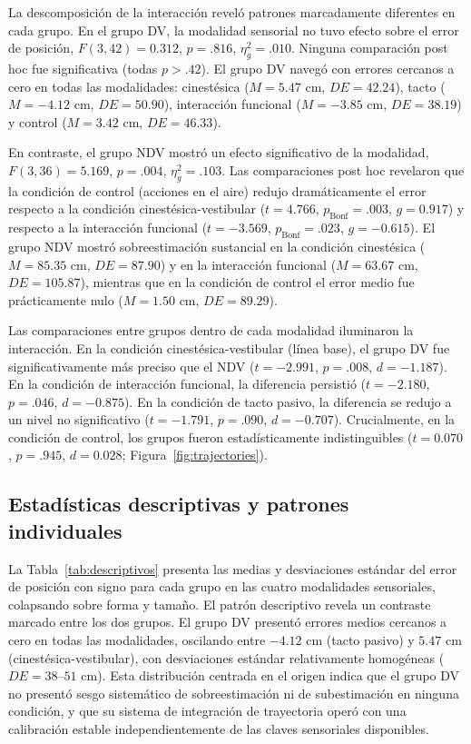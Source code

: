 \documentclass[12pt,letterpaper]{article}
\begin{document}
La descomposición de la interacción reveló patrones marcadamente diferentes en cada grupo. En el grupo DV, la modalidad sensorial no tuvo efecto sobre el error de posición, $F(3, 42) = 0.312$, $p = .816$, $\eta^2_g = .010$. Ninguna comparación post hoc fue significativa (todas $p > .42$). El grupo DV navegó con errores cercanos a cero en todas las modalidades: cinestésica ($M = 5.47$ cm, $DE = 42.24$), tacto ($M = -4.12$ cm, $DE = 50.90$), interacción funcional ($M = -3.85$ cm, $DE = 38.19$) y control ($M = 3.42$ cm, $DE = 46.33$).

En contraste, el grupo NDV mostró un efecto significativo de la modalidad, $F(3, 36) = 5.169$, $p = .004$, $\eta^2_g = .103$. Las comparaciones post hoc revelaron que la condición de control (acciones en el aire) redujo dramáticamente el error respecto a la condición cinestésica-vestibular ($t = 4.766$, $p_{\text{Bonf}} = .003$, $g = 0.917$) y respecto a la interacción funcional ($t = -3.569$, $p_{\text{Bonf}} = .023$, $g = -0.615$). El grupo NDV mostró sobreestimación sustancial en la condición cinestésica ($M = 85.35$ cm, $DE = 87.90$) y en la interacción funcional ($M = 63.67$ cm, $DE = 105.87$), mientras que en la condición de control el error medio fue prácticamente nulo ($M = 1.50$ cm, $DE = 89.29$).

Las comparaciones entre grupos dentro de cada modalidad iluminaron la interacción. En la condición cinestésica-vestibular (línea base), el grupo DV fue significativamente más preciso que el NDV ($t = -2.991$, $p = .008$, $d = -1.187$). En la condición de interacción funcional, la diferencia persistió ($t = -2.180$, $p = .046$, $d = -0.875$). En la condición de tacto pasivo, la diferencia se redujo a un nivel no significativo ($t = -1.791$, $p = .090$, $d = -0.707$). Crucialmente, en la condición de control, los grupos fueron estadísticamente indistinguibles ($t = 0.070$, $p = .945$, $d = 0.028$; Figura~\ref{fig:trajectories}).

\subsection{Estadísticas descriptivas y patrones individuales}

La Tabla~\ref{tab:descriptivos} presenta las medias y desviaciones estándar del error de posición con signo para cada grupo en las cuatro modalidades sensoriales, colapsando sobre forma y tamaño. El patrón descriptivo revela un contraste marcado entre los dos grupos. El grupo DV presentó errores medios cercanos a cero en todas las modalidades, oscilando entre $-4.12$ cm (tacto pasivo) y $5.47$ cm (cinestésica-vestibular), con desviaciones estándar relativamente homogéneas ($DE = 38$--$51$ cm). Esta distribución centrada en el origen indica que el grupo DV no presentó sesgo sistemático de sobreestimación ni de subestimación en ninguna condición, y que su sistema de integración de trayectoria operó con una calibración estable independientemente de las claves sensoriales disponibles.
\end{document}
